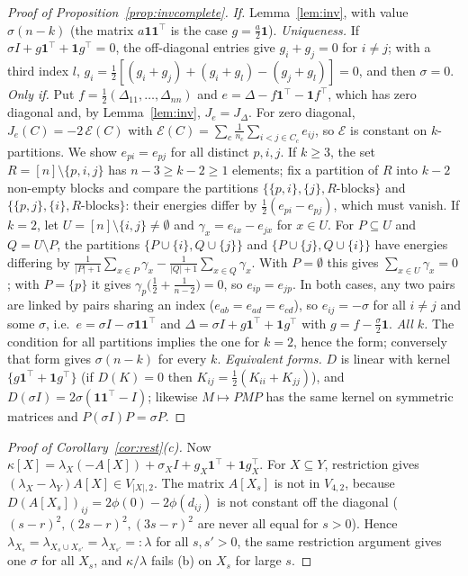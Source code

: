 \documentclass[11pt,a4paper]{article}
\theoremstyle{plain}
\theoremstyle{definition}
\theoremstyle{remark}
\newcommand{\one}{\mathbf 1}
\begin{document}
\begin{proof}[Proof of Proposition~\ref{prop:invcomplete}]
\emph{If.} Lemma~\ref{lem:inv}, with value $\sigma(n-k)$ (the matrix $a\one\one^{\!\top}$ is the case $g=\tfrac a2\one$).
\emph{Uniqueness.} If $\sigma I+g\one^{\!\top}+\one g^{\!\top}=0$, the off-diagonal entries give $g_i+g_j=0$ for $i\ne j$; with a third index $l$, $g_i=\tfrac12[(g_i+g_j)+(g_i+g_l)-(g_j+g_l)]=0$, and then $\sigma=0$.
\emph{Only if.} Put $f=\tfrac12(\Delta_{11},\dots,\Delta_{nn})$ and $e=\Delta-f\one^{\!\top}-\one f^{\!\top}$, which has zero diagonal and, by Lemma~\ref{lem:inv}, $J_e=J_\Delta$. For zero diagonal, $J_e(C)=-2\,\mathcal E(C)$ with $\mathcal E(C)=\sum_c\frac1{n_c}\sum_{i<j\in C_c}e_{ij}$, so $\mathcal E$ is constant on $k$-partitions. We show $e_{pi}=e_{pj}$ for all distinct $p,i,j$. If $k\ge3$, the set $R=[n]\setminus\{p,i,j\}$ has $n-3\ge k-2\ge1$ elements; fix a partition of $R$ into $k-2$ non-empty blocks and compare the partitions $\{\{p,i\},\{j\},R\text{-blocks}\}$ and $\{\{p,j\},\{i\},R\text{-blocks}\}$: their energies differ by $\tfrac12(e_{pi}-e_{pj})$, which must vanish. If $k=2$, let $U=[n]\setminus\{i,j\}\neq\emptyset$ and $\gamma_x=e_{ix}-e_{jx}$ for $x\in U$. For $P\subseteq U$ and $Q=U\setminus P$, the partitions $\{P\cup\{i\},Q\cup\{j\}\}$ and $\{P\cup\{j\},Q\cup\{i\}\}$ have energies differing by $\frac1{|P|+1}\sum_{x\in P}\gamma_x-\frac1{|Q|+1}\sum_{x\in Q}\gamma_x$. With $P=\emptyset$ this gives $\sum_{x\in U}\gamma_x=0$; with $P=\{p\}$ it gives $\gamma_p\bigl(\tfrac12+\tfrac1{n-2}\bigr)=0$, so $e_{ip}=e_{jp}$. In both cases, any two pairs are linked by pairs sharing an index ($e_{ab}=e_{ad}=e_{cd}$), so $e_{ij}=-\sigma$ for all $i\ne j$ and some $\sigma$, i.e.\ $e=\sigma I-\sigma\one\one^{\!\top}$ and $\Delta=\sigma I+g\one^{\!\top}+\one g^{\!\top}$ with $g=f-\tfrac\sigma2\one$.
\emph{All $k$.} The condition for all partitions implies the one for $k=2$, hence the form; conversely that form gives $\sigma(n-k)$ for every $k$.
\emph{Equivalent forms.} $D$ is linear with kernel $\{g\one^{\!\top}+\one g^{\!\top}\}$ (if $D(K)=0$ then $K_{ij}=\tfrac12(K_{ii}+K_{jj})$), and $D(\sigma I)=2\sigma(\one\one^{\!\top}-I)$; likewise $M\mapsto PMP$ has the same kernel on symmetric matrices and $P(\sigma I)P=\sigma P$.
\end{proof}

\begin{proof}[Proof of Corollary~\ref{cor:rest}(c)]
Now $\kappa[X]=\lambda_X(-A[X])+\sigma_XI+g_X\one^{\!\top}+\one g_X^{\!\top}$. For $X\subseteq Y$, restriction gives $(\lambda_X-\lambda_Y)A[X]\in V_{|X|,2}$. The matrix $A[X_s]$ is not in $V_{4,2}$, because $D(A[X_s])_{ij}=2\phi(0)-2\phi(d_{ij})$ is not constant off the diagonal ($(s-r)^2,(2s-r)^2,(3s-r)^2$ are never all equal for $s>0$). Hence $\lambda_{X_s}=\lambda_{X_s\cup X_{s'}}=\lambda_{X_{s'}}=:\lambda$ for all $s,s'>0$, the same restriction argument gives one $\sigma$ for all $X_s$, and $\kappa/\lambda$ fails (b) on $X_s$ for large $s$.
\end{proof}
\end{document}
